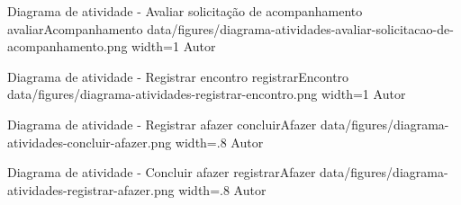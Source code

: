 \image
    {Diagrama de atividade - Avaliar solicitação de acompanhamento}
    {avaliarAcompanhamento}
    {data/figures/diagrama-atividades-avaliar-solicitacao-de-acompanhamento.png}
    {width=1\textwidth}
    {Autor}

\image
    {Diagrama de atividade - Registrar encontro}
    {registrarEncontro}
    {data/figures/diagrama-atividades-registrar-encontro.png}
    {width=1\textwidth}
    {Autor}

\image
    {Diagrama de atividade - Registrar afazer}
    {concluirAfazer}
    {data/figures/diagrama-atividades-concluir-afazer.png}
    {width=.8\textwidth}
    {Autor}

\image
    {Diagrama de atividade - Concluir afazer}
    {registrarAfazer}
    {data/figures/diagrama-atividades-registrar-afazer.png}
    {width=.8\textwidth}
    {Autor}